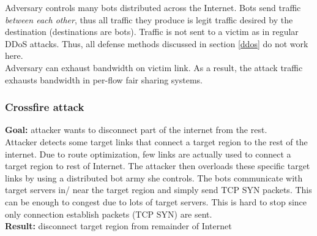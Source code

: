 \documentclass[11pt,oneside,a4paper]{article}
\begin{document}
Adversary controls many bots distributed across the Internet. Bots send traffic \textit{between each other}, thus all traffic they produce is legit traffic desired by the destination (destinations are bots). Traffic is not sent to a victim as in regular DDoS attacks. Thus, all defense methods discussed in section \ref{ddos} do not work here.\\
Adversary can exhaust bandwidth on victim link. As a result, the attack traffic exhausts bandwidth in per-flow fair sharing systems.

\subsubsection{Crossfire attack}

\textbf{Goal:} attacker wants to disconnect part of the internet from the rest.\\
\noindent Attacker detects some target links that connect a target region to the rest of the internet. Due to route optimization, few links are actually used to connect a
target region to rest of Internet. The attacker then overloads these specific target links by using a distributed bot army she controls. The bots communicate with target servers in/ near the target region and simply send TCP SYN packets. This can be enough to congest due to lots of target servers. This is hard to stop since only connection establish packets (TCP SYN) are sent.\\
\textbf{Result:} disconnect target region from remainder of Internet
\end{document}
